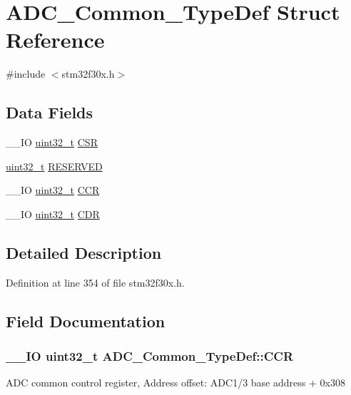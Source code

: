 \hypertarget{struct_a_d_c___common___type_def}{\section{A\-D\-C\-\_\-\-Common\-\_\-\-Type\-Def Struct Reference}
\label{struct_a_d_c___common___type_def}
}


{\ttfamily \#include $<$stm32f30x.\-h$>$}

\subsection*{Data Fields}
\begin{DoxyCompactItemize}
\item 
\-\_\-\-\_\-\-I\-O \hyperlink{stdint_8h_a435d1572bf3f880d55459d9805097f62}{uint32\-\_\-t} \hyperlink{struct_a_d_c___common___type_def_ac38e24f600f9e134a54a0c43b976a4f4}{C\-S\-R}
\item 
\hyperlink{stdint_8h_a435d1572bf3f880d55459d9805097f62}{uint32\-\_\-t} \hyperlink{struct_a_d_c___common___type_def_a5206a0915a426980291c55c79db38890}{R\-E\-S\-E\-R\-V\-E\-D}
\item 
\-\_\-\-\_\-\-I\-O \hyperlink{stdint_8h_a435d1572bf3f880d55459d9805097f62}{uint32\-\_\-t} \hyperlink{struct_a_d_c___common___type_def_aee6d4af7571a1bad2fec9e7b53733277}{C\-C\-R}
\item 
\-\_\-\-\_\-\-I\-O \hyperlink{stdint_8h_a435d1572bf3f880d55459d9805097f62}{uint32\-\_\-t} \hyperlink{struct_a_d_c___common___type_def_a6f7399bf70f677ef5de46a3038f414e1}{C\-D\-R}
\end{DoxyCompactItemize}


\subsection{Detailed Description}


Definition at line 354 of file stm32f30x.\-h.



\subsection{Field Documentation}
\hypertarget{struct_a_d_c___common___type_def_aee6d4af7571a1bad2fec9e7b53733277}{
\subsubsection[{C\-C\-R}]{\setlength{\rightskip}{0pt plus 5cm}\-\_\-\-\_\-\-I\-O {\bf uint32\-\_\-t} A\-D\-C\-\_\-\-Common\-\_\-\-Type\-Def\-::\-C\-C\-R}}\label{struct_a_d_c___common___type_def_aee6d4af7571a1bad2fec9e7b53733277}
A\-D\-C common control register, Address offset\-: A\-D\-C1/3 base address + 0x308

